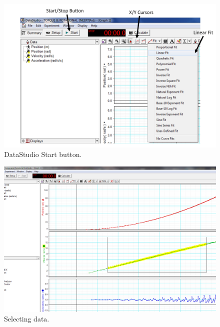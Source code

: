 \begin{figure}[h]
	\begin{center}
		\includegraphics[width=0.9\linewidth]{./Exp1-7/pic/screenshot1.jpg}
	\end{center}
	\caption{DataStudio Start button.}
	\label{fig:screenshot1}
\end{figure}
\begin{figure}[h]
	\begin{center}
		\includegraphics[width=0.9\linewidth]{./Exp1-7/pic/screenshot2.png}
	\end{center}
	\caption{Selecting data.}
	\label{fig:screenshot2}
\end{figure}
